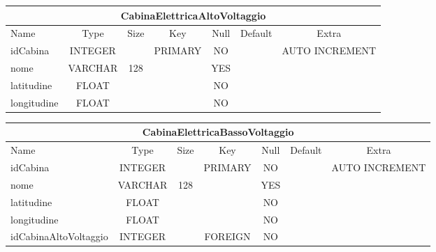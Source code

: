 \begin{center}
    \begin{tabular}{ |l|c|c|c|c|c|c| } 
        \hline
        \multicolumn{7}{|c|}{CabinaElettricaAltoVoltaggio} \\
        \hline
            Name             & Type     & Size  & Key       & Null  & Default   & Extra \\
        \hline
            idCabina         & INTEGER  &       & PRIMARY   & NO    &           & AUTO INCREMENT \\
            nome             & VARCHAR  & 128   &           & YES   &           & \\
            latitudine       & FLOAT    &       &           & NO    &           & \\
            longitudine      & FLOAT    &       &           & NO    &           & \\
        \hline
    \end{tabular}
\end{center}

\begin{center}
    \begin{tabular}{ |l|c|c|c|c|c|c| } 
        \hline
        \multicolumn{7}{|c|}{CabinaElettricaBassoVoltaggio} \\
        \hline
            Name                  & Type     & Size  & Key       & Null  & Default   & Extra \\
        \hline
            idCabina              & INTEGER  &       & PRIMARY   & NO    &           & AUTO INCREMENT \\
            nome                  & VARCHAR  & 128   &           & YES   &           & \\
            latitudine            & FLOAT    &       &           & NO    &           & \\
            longitudine           & FLOAT    &       &           & NO    &           & \\
            idCabinaAltoVoltaggio & INTEGER  &       & FOREIGN   & NO    &           & \\
        \hline
    \end{tabular}
\end{center}

